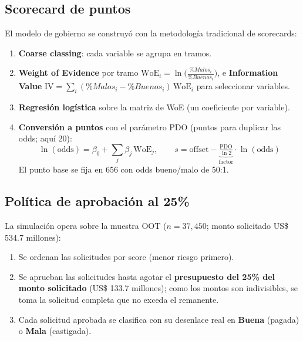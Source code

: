 \documentclass[11pt, letterpaper]{article}
\newcommand{\bt}[1]{\textbf{#1}}
\begin{document}
\subsection{Scorecard de puntos}

El modelo de gobierno se construyó con la metodología tradicional de
scorecards:

\begin{enumerate}
  \item \bt{Coarse classing}: cada variable se agrupa en tramos.
  \item \bt{Weight of Evidence} por tramo
        $\mathrm{WoE}_i = \ln\!\big(\tfrac{\%Malos_i}{\%Buenos_i}\big)$, e
        \bt{Information Value} $\mathrm{IV} = \sum_i
        (\%Malos_i - \%Buenos_i)\,\mathrm{WoE}_i$ para seleccionar variables.
  \item \bt{Regresión logística} sobre la matriz de WoE (un coeficiente por
        variable).
  \item \bt{Conversión a puntos} con el parámetro PDO (puntos para duplicar
        las odds; aquí 20):
        \begin{equation*}
          \ln(\text{odds}) = \beta_0 + \sum_j \beta_j\,\mathrm{WoE}_j, \qquad
          s = \text{offset} - \underbrace{\tfrac{\text{PDO}}{\ln 2}}_{\text{factor}}
          \cdot \ln(\text{odds})
        \end{equation*}
        El punto base se fija en 656 con odds bueno/malo de 50:1.
\end{enumerate}

\subsection{Política de aprobación al 25\%}

La simulación opera sobre la muestra OOT ($n=37{,}450$; monto solicitado
US\$ 534.7 millones):

\begin{enumerate}
  \item Se ordenan las solicitudes por score (menor riesgo primero).
  \item Se aprueban las solicitudes hasta agotar el \bt{presupuesto del 25\%
        del monto solicitado} (US\$ 133.7 millones); como los montos son
        indivisibles, se toma la solicitud completa que no exceda el remanente.
  \item Cada solicitud aprobada se clasifica con su desenlace real en
        \bt{Buena} (pagada) o \bt{Mala} (castigada).
\end{enumerate}
\end{document}
